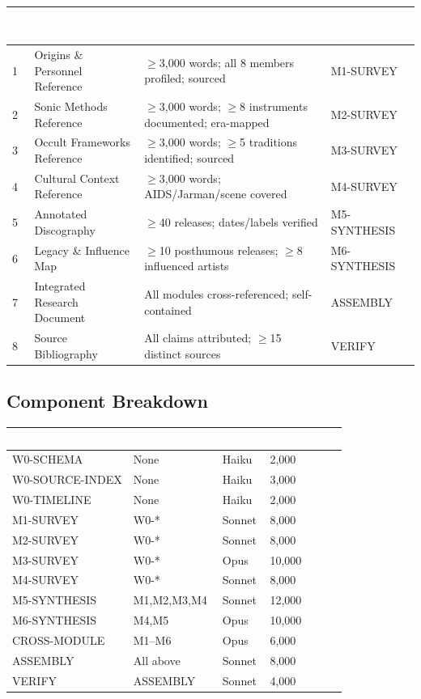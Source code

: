 \documentclass[11pt,letterpaper]{article}
\newcommand{\tableheader}[1]{\textbf{\sffamily\textcolor{white}{#1}}}
\begin{document}
\begin{center}
\begin{tabularx}{\textwidth}{C{0.5cm}L{3.5cm}XL{2.5cm}}
\toprule
{}
\tableheader{\#} & \tableheader{Deliverable} & \tableheader{Acceptance Criteria} & \tableheader{Component Spec} \\
 & Origins \& Personnel Reference & $\geq$3,000 words; all 8 members profiled; sourced & M1-SURVEY \\
2 & Sonic Methods Reference & $\geq$3,000 words; $\geq$8 instruments documented; era-mapped & M2-SURVEY \\
3 & Occult Frameworks Reference & $\geq$3,000 words; $\geq$5 traditions identified; sourced & M3-SURVEY \\
4 & Cultural Context Reference & $\geq$3,000 words; AIDS/Jarman/scene covered & M4-SURVEY \\
5 & Annotated Discography & $\geq$40 releases; dates/labels verified & M5-SYNTHESIS \\
6 & Legacy \& Influence Map & $\geq$10 posthumous releases; $\geq$8 influenced artists & M6-SYNTHESIS \\
7 & Integrated Research Document & All modules cross-referenced; self-contained & ASSEMBLY \\
8 & Source Bibliography & All claims attributed; $\geq$15 distinct sources & VERIFY \\
\bottomrule
\end{tabularx}
\end{center}

\subsection{Component Breakdown}

\begin{center}
\begin{tabularx}{\textwidth}{L{3cm}L{2.5cm}C{1.5cm}C{2cm}}
\toprule
{}
\tableheader{Component} & \tableheader{Dependencies} & \tableheader{Model} & \tableheader{Est. Tokens} \\
\midrule
W0-SCHEMA & None & Haiku & 2,000 \\
W0-SOURCE-INDEX & None & Haiku & 3,000 \\
W0-TIMELINE & None & Haiku & 2,000 \\
M1-SURVEY & W0-* & Sonnet & 8,000 \\
M2-SURVEY & W0-* & Sonnet & 8,000 \\
M3-SURVEY & W0-* & Opus & 10,000 \\
M4-SURVEY & W0-* & Sonnet & 8,000 \\
M5-SYNTHESIS & M1,M2,M3,M4 & Sonnet & 12,000 \\
M6-SYNTHESIS & M4,M5 & Opus & 10,000 \\
CROSS-MODULE & M1--M6 & Opus & 6,000 \\
ASSEMBLY & All above & Sonnet & 8,000 \\
VERIFY & ASSEMBLY & Sonnet & 4,000 \\
\bottomrule
\end{tabularx}
\end{center}
\end{document}
